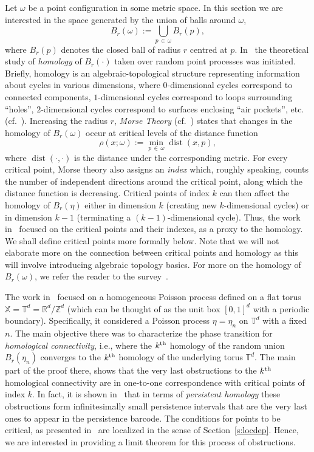 \documentclass[AHL,Unicode,longabstracts]{cedram}
\DeclareMathOperator{\dist}{dist}
\newcommand*\R{\mathbb{R}}
\newcommand*\Z{\mathbb{Z}}
\newcommand*\T{\mathbb{T}}
\newcommand*\X{\mathbb{X}}
\begin{document}
Let $\omega$ be a point configuration in some metric space. In this section we are interested in the space generated by the union of balls around $\omega$,
\[
B_r(\omega) := \bigcup_{p\,\in\,\omega} B_r(p),
\]
{where $B_r(p)$ denotes the closed ball of radius $r$ centred at $p$.} In~\cite{kahle_random_2011} the theoretical study of \emph{homology} of $B_r(\cdot)$ taken over random point processes was initiated. Briefly, homology is an algebraic-topological structure representing information about cycles in various dimensions, where $0$-dimensional cycles correspond to connected components, $1$-dimensional cycles correspond to loops surrounding ``holes'', $2$-dimensional cycles correspond to surfaces enclosing ``air pockets'', etc. (cf.~\cite{hatcher_algebraic_2002}). Increasing the radius $r$, \emph{Morse Theory} (cf.~\cite{gershkovich_morse_1997,milnor_morse_1963}) states that changes in the homology of $B_r(\omega)$ occur at critical levels of the distance function
\[
\rho(x;\omega) := \min_{p\,\in\,\omega} \dist(x,p),
\]
where $\dist(\cdot,\cdot)$ is the distance under the corresponding metric. For every critical point, Morse theory also assigns an \emph{index} which, roughly speaking, counts the number of independent directions around the critical point, along which the distance function is decreasing. Critical points of index $k$ can then affect the homology of $B_r(\eta)$ either in dimension $k$ (creating new $k$-dimensional cycles) or in dimension $k-1$ (terminating a $(k-1)$-dimensional cycle). Thus, the work in~\cite{bobrowski_distance_2014,Bobrowski2019} focused on the critical points and their indexes, as a proxy to the homology. We shall define critical points more formally below. Note that we will not elaborate more on the connection between critical points and homology as this will involve introducing algebraic topology basics. For more on the homology of $B_r(\omega)$, we refer the reader to the survey~\cite{Bobrowski2018}.

The work in~\cite{Bobrowski2019} focused on a homogeneous Poisson process defined on a flat torus $\X = \T^d = \R^d/\Z^d$ (which can be thought of as the unit box $[0,1]^d$ with a periodic boundary). Specifically, it considered a Poisson process $\eta=\eta_n$ on $\T^d$ with a fixed $n$. The main objective there was to characterize the phase transition for \emph{homological connectivity}, i.e., where the $k^{\rm th}$ homology of the random union $B_r(\eta_n)$ converges to the $k^{\rm th}$ homology of the underlying torus $\T^d$. The main part of the proof there, shows that the very last obstructions to the $k^{\rm th}$ homological connectivity are in one-to-one correspondence with critical points of index $k$. In fact, it is shown in~\cite[Section~8]{Bobrowski2019} that in terms of \emph{persistent homology} these obstructions form infinitesimally small persistence intervals that are the very last ones to appear in the persistence barcode. The conditions for points to be critical, as presented in~\cite[Section~2.3]{Bobrowski2019} are localized in the sense of Section~\ref{s:locdep}. Hence, we are interested in providing a {limit} theorem for this process of obstructions.
\end{document}
